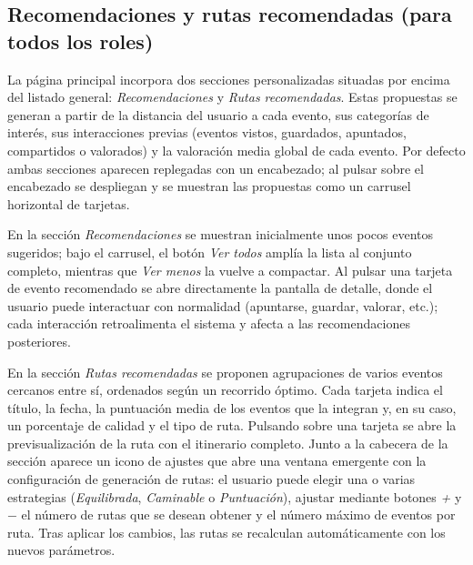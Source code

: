 \clearpage

\subsection{Recomendaciones y rutas recomendadas (para todos los roles)}

La página principal incorpora dos secciones personalizadas situadas por encima del listado general: \textit{Recomendaciones} y \textit{Rutas recomendadas}. Estas propuestas se generan a partir de la distancia del usuario a cada evento, sus categorías de interés, sus interacciones previas (eventos vistos, guardados, apuntados, compartidos o valorados) y la valoración media global de cada evento. Por defecto ambas secciones aparecen replegadas con un encabezado; al pulsar sobre el encabezado se despliegan y se muestran las propuestas como un carrusel horizontal de tarjetas.

En la sección \textit{Recomendaciones} se muestran inicialmente unos pocos eventos sugeridos; bajo el carrusel, el botón \textit{Ver todos} amplía la lista al conjunto completo, mientras que \textit{Ver menos} la vuelve a compactar. Al pulsar una tarjeta de evento recomendado se abre directamente la pantalla de detalle, donde el usuario puede interactuar con normalidad (apuntarse, guardar, valorar, etc.); cada interacción retroalimenta el sistema y afecta a las recomendaciones posteriores.

En la sección \textit{Rutas recomendadas} se proponen agrupaciones de varios eventos cercanos entre sí, ordenados según un recorrido óptimo. Cada tarjeta indica el título, la fecha, la puntuación media de los eventos que la integran y, en su caso, un porcentaje de calidad y el tipo de ruta. Pulsando sobre una tarjeta se abre la previsualización de la ruta con el itinerario completo. Junto a la cabecera de la sección aparece un icono de ajustes que abre una ventana emergente con la configuración de generación de rutas: el usuario puede elegir una o varias estrategias (\textit{Equilibrada}, \textit{Caminable} o \textit{Puntuación}), ajustar mediante botones \textit{+} y \textit{$-$} el número de rutas que se desean obtener y el número máximo de eventos por ruta. Tras aplicar los cambios, las rutas se recalculan automáticamente con los nuevos parámetros.

